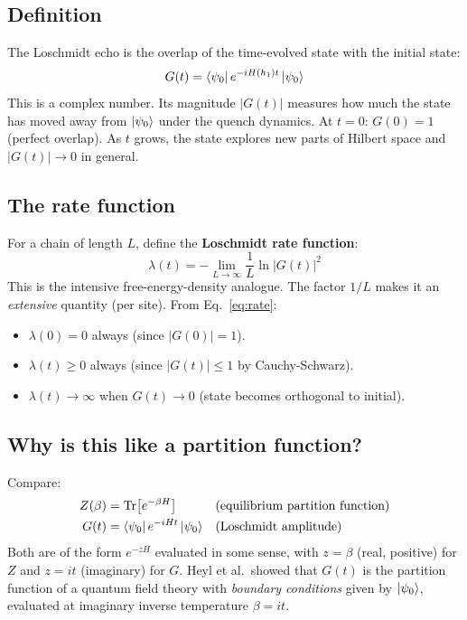 \documentclass[11pt, a4paper]{article}
\begin{document}
\subsection{Definition}

The Loschmidt echo is the overlap of the time-evolved state with the initial state:
\begin{equation}
  G(t) = \bra{\psi_0} e^{-i H(h_1) t} \ket{\psi_0}
  \label{eq:loschmidt}
\end{equation}
This is a complex number. Its magnitude $|G(t)|$ measures how much the state has moved away from $\ket{\psi_0}$ under the quench dynamics. At $t = 0$: $G(0) = 1$ (perfect overlap). As $t$ grows, the state explores new parts of Hilbert space and $|G(t)| \to 0$ in general.

\subsection{The rate function}

For a chain of length $L$, define the \textbf{Loschmidt rate function}:
\begin{equation}
  \lambda(t) = -\lim_{L \to \infty} \frac{1}{L} \ln|G(t)|^2
  \label{eq:rate}
\end{equation}
This is the intensive free-energy-density analogue. The factor $1/L$ makes it an
\emph{extensive} quantity (per site). From Eq.~\eqref{eq:rate}:
\begin{itemize}
  \item $\lambda(0) = 0$ always (since $|G(0)| = 1$).
  \item $\lambda(t) \geq 0$ always (since $|G(t)| \leq 1$ by Cauchy-Schwarz).
  \item $\lambda(t) \to \infty$ when $G(t) \to 0$ (state becomes orthogonal to initial).
\end{itemize}

\subsection{Why is this like a partition function?}

Compare:
\begin{align}
  Z(\beta) &= \Tr\!\left[e^{-\beta H}\right] & &\text{(equilibrium partition function)} \\
  G(t)     &= \bra{\psi_0} e^{-i H t} \ket{\psi_0} & &\text{(Loschmidt amplitude)}
\end{align}
Both are of the form $e^{-z H}$ evaluated in some sense, with $z = \beta$ (real, positive) for $Z$ and $z = it$ (imaginary) for $G$. Heyl et al.\ showed that $G(t)$ is the partition function of a quantum field theory with \emph{boundary conditions} given by $\ket{\psi_0}$, evaluated at imaginary inverse temperature $\beta = it$.
\end{document}
